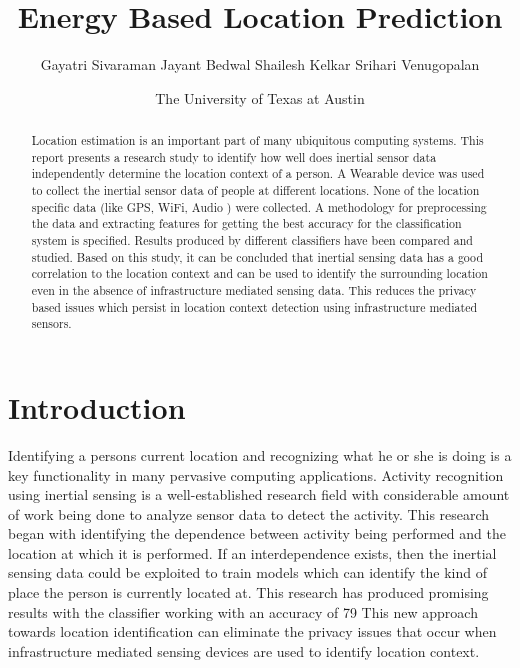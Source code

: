 \documentclass{acm_proc_article-sp}
\begin{document}
\title{Energy Based Location Prediction}

\author{
\alignauthor
Gayatri Sivaraman
\alignauthor
Jayant Bedwal
\alignauthor
Shailesh Kelkar
\alignauthor
Srihari Venugopalan
\and
The University of Texas at Austin
}

\maketitle
\begin{abstract}
Location estimation is an important part of many ubiquitous computing systems. This report presents a research study to identify how well does inertial sensor data independently determine the location context of a person. A Wearable device was used to collect the inertial sensor data of people at different locations. None of the location specific data (like GPS, WiFi, Audio ) were collected. A methodology for preprocessing the data and extracting features for getting the best accuracy for the classification system is specified. Results produced by different classifiers have been compared and studied. Based on this study, it can be concluded that inertial sensing data has a good correlation to the location context and can be used to identify the surrounding location even in the absence of infrastructure mediated sensing data. This reduces the privacy based issues which persist in location context detection using infrastructure mediated sensors.
\end{abstract}


\section{Introduction}
Identifying a person\textsc{}s current location and recognizing what he or she is doing \textsc{} is a key functionality in many pervasive computing applications. Activity recognition using inertial sensing is a well-established research field with considerable amount of work being done to analyze sensor data to detect the activity. This research began with identifying the dependence between activity being performed and the location at which it is performed. If an inter\textsc{}dependence exists, then the inertial sensing data could be exploited to train models which can identify the kind of place the person is currently located at. This research has produced promising results with the classifier working with an accuracy of 79\textsc{}  
This new approach towards location identification can eliminate the privacy issues that occur when infrastructure mediated sensing devices are used to identify location context.
\end{document}

